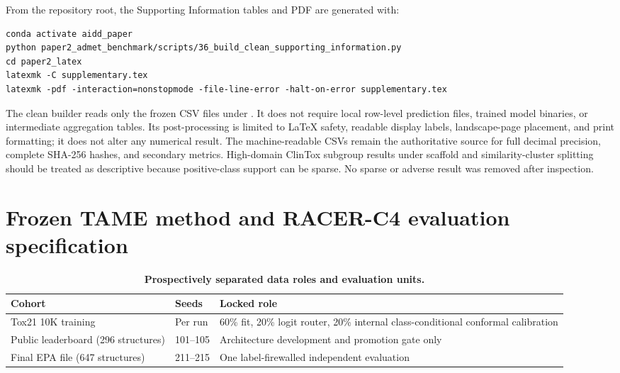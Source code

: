 \documentclass[10pt]{article}
\begin{document}
From the repository root, the Supporting Information tables and PDF are generated with:

\begin{verbatim}
conda activate aidd_paper
python paper2_admet_benchmark/scripts/36_build_clean_supporting_information.py
cd paper2_latex
latexmk -C supplementary.tex
latexmk -pdf -interaction=nonstopmode -file-line-error -halt-on-error supplementary.tex
\end{verbatim}

The clean builder reads only the frozen CSV files under . It does not require local row-level prediction files, trained model binaries, or intermediate aggregation tables. Its post-processing is limited to LaTeX safety, readable display labels, landscape-page placement, and print formatting; it does not alter any numerical result. The machine-readable CSVs remain the authoritative source for full decimal precision, complete SHA-256 hashes, and secondary metrics. High-domain ClinTox subgroup results under scaffold and similarity-cluster splitting should be treated as descriptive because positive-class support can be sparse. No sparse or adverse result was removed after inspection.

\section{Frozen TAME method and RACER-C4 evaluation specification}

\begin{table}[!htbp]
\centering
\caption{\textbf{Prospectively separated data roles and evaluation units.}}
\small
\begin{tabular}{p{}p{}p{}}
\toprule
Cohort & Seeds & Locked role \\
\midrule
Tox21 10K training & Per run & 60\% fit, 20\% logit router, 20\% internal class-conditional conformal calibration \\
Public leaderboard (296 structures) & 101--105 & Architecture development and promotion gate only \\
Final EPA file (647 structures) & 211--215 & One label-firewalled independent evaluation \\
\bottomrule
\end{tabular}
\end{table}
\end{document}
